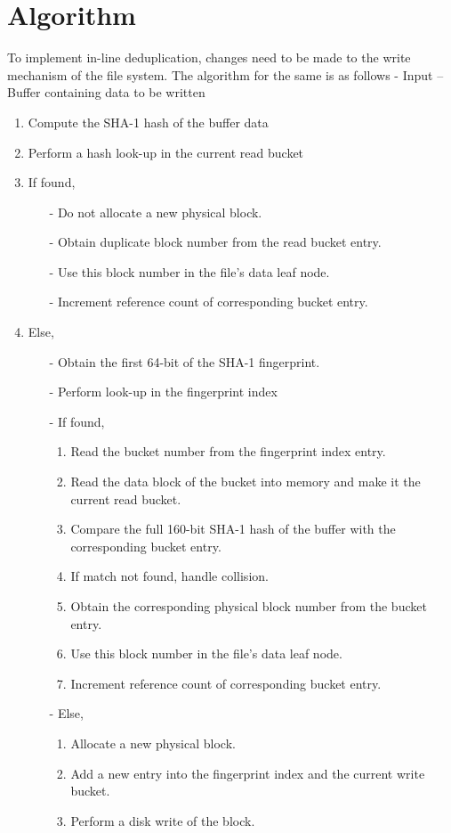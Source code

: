 \documentclass[final]{ols}
\begin{document}
\section{Algorithm}
To implement in-line deduplication, changes need to be made to the write mechanism of the file system. The algorithm for the same is as follows -
\newpage
Input --  Buffer containing data to be written 

\begin{enumerate}
\item Compute the SHA-1 hash of the buffer data 
\item Perform a hash look-up in the current read bucket 
\item If found, 
  \begin{enumerate}
  \item[-] Do not allocate a new physical block.
  \item[-] Obtain duplicate block number from the read bucket entry.
  \item[-] Use this block number in the file's data leaf node.
  \item[-] Increment reference count of corresponding bucket entry.
  \end{enumerate}
\item Else,
  \begin{enumerate}
  \item[-] Obtain the first 64-bit of the SHA-1 fingerprint.
  \item[-] Perform look-up in the fingerprint index
  \item[-] If found,
    \begin{enumerate}
    \item Read the bucket number from the fingerprint index entry.
    \item Read the data block of the bucket into memory and make it the current read bucket.
    \item Compare the full 160-bit SHA-1 hash of the buffer with the corresponding bucket entry.
    \item If match not found, handle collision.
    \item Obtain the corresponding physical block number from the bucket entry.
    \item Use this block number in the file's data leaf node.
    \item Increment reference count of corresponding bucket entry.
    \end{enumerate}
  \item[-] Else,
    \begin{enumerate}
    \item Allocate a new physical block.
    \item Add a new entry into the fingerprint index and the current write bucket.
    \item Perform a disk write of the block.
    \end{enumerate}
  \end{enumerate}
\end{enumerate}
\end{document}
